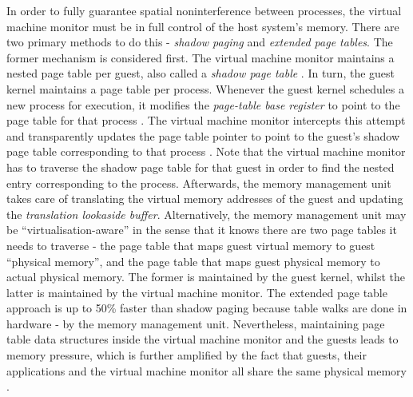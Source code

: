 In order to fully guarantee spatial noninterference between processes, the virtual machine monitor must 
be in full control of the host system's memory. There are two primary methods to do this - 
\textit{shadow paging} and \textit{extended page tables}. The former mechanism is considered first. 
The virtual machine monitor maintains a nested page table 
per guest, also called a \textit{shadow page table} \cite{10.5555/1204009}. 
In turn, the guest kernel maintains a page table per process. 
Whenever the guest kernel schedules a new process for execution, it modifies the \textit{page-table 
base register} to point to the page table for that process \cite{10.5555/1204009}. 
The virtual machine monitor intercepts this attempt and transparently updates the page table pointer to point to 
the guest's shadow page table corresponding to that process \cite{10.5555/1204009}. Note that 
the virtual machine monitor has to traverse the shadow page table for that guest in order to find the nested entry corresponding 
to the process. Afterwards, the memory management unit takes care of translating the virtual memory 
addresses of the guest and updating the \textit{translation lookaside buffer}.
Alternatively, the memory management unit may be \enquote{virtualisation-aware} in the sense that it knows 
there are two page tables it needs to traverse - the page table that maps guest virtual memory to guest 
\enquote{physical memory}, and the page table that maps guest physical memory to actual physical memory. 
The former is maintained by the guest kernel, whilst the latter is maintained by the virtual machine monitor.
The extended page table approach is up to 50\% faster than shadow paging \cite{2006PerformanceEO} because table
walks are done in hardware - by the memory management unit.
Nevertheless, maintaining page table data structures inside the virtual machine 
monitor and the guests leads to memory pressure, which is further amplified by the fact that 
guests, their applications and the virtual machine monitor all share the same physical memory \cite{10.5555/2490781}. 

